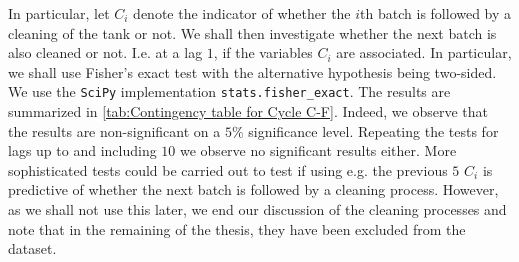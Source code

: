 \documentclass[../Thesis.tex]{subfiles}
\begin{document}


In particular, let $C_i$ denote the indicator of whether the $i$th batch is followed by a cleaning of the tank or not. We shall then investigate whether the next batch is also cleaned or not. I.e. at a lag $1$, if the variables $C_i$ are associated. In particular, we shall use Fisher's exact test with the alternative hypothesis being two-sided. We use the \texttt{SciPy} implementation \texttt{stats.fisher_exact}. The results are summarized in \autoref{tab:Contingency table for Cycle C-F}. Indeed, we observe that the results are non-significant on a $5\%$ significance level. Repeating the tests for lags up to and including $10$ we observe no significant results either. More sophisticated tests could be carried out to test if using e.g. the previous $5$ $C_i$ is predictive of whether the next batch is followed by a cleaning process. However, as we shall not use this later, we end our discussion of the cleaning processes and note that in the remaining of the thesis, they have been excluded from the dataset.


\end{document}
